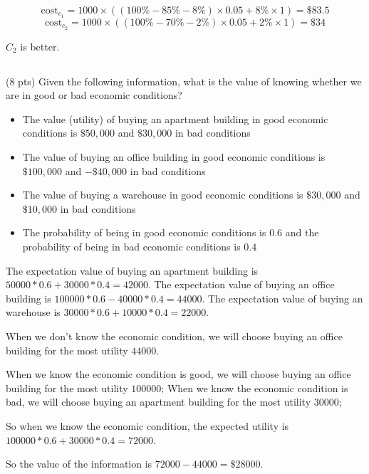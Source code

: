 \documentclass[paper=a4, fontsize=11pt]{scrartcl} %
\begin{document}
\[\text{cost}_{c_1}
= 1000\times((100\%-85\%-8\%)\times 0.05 + 8\%\times 1)
= \$83.5\]
\[\text{cost}_{c_2}
= 1000\times((100\%-70\%-2\%)\times 0.05 + 2\%\times 1)
= \$34\]

$C_2$ is better.

\subsection{}
\begin{fancyquotes}
  (8 pts) Given the following information, what is the value of
  knowing whether we are in good or bad economic conditions?
  \begin{itemize}
  \item The value (utility) of buying an apartment building in good
    economic conditions is $\$50,000$ and $\$30,000$ in bad conditions
  \item The value of buying an office building in good economic
    conditions is $\$100,000$ and $-\$40,000$ in bad conditions
  \item The value of buying a warehouse in good economic conditions is
    $\$30,000$ and $\$10,000$ in bad conditions
  \item The probability of being in good economic conditions is $0.6$
    and the probability of being in bad economic conditions is $0.4$
  \end{itemize}
\end{fancyquotes}

The expectation value of buying an apartment building is
$50000*0.6+30000*0.4=42000$.
The expectation value of buying an office building is
$100000*0.6-40000*0.4=44000$.
The expectation value of buying an warehouse is
$30000*0.6+10000*0.4=22000$.

When we don't know the economic condition, we will choose buying an
office building for the most utility $44000$.

When we know the economic condition is good, we will choose buying an
office building for the most utility $100000$;
When we know the economic condition is bad, we will choose buying an
apartment building for the most utility $30000$;

So when we know the economic condition, the expected utility is
$100000*0.6+30000*0.4=72000$.

So the value of the information is $72000-44000=\$28000$.

\pagebreak

\end{document}
